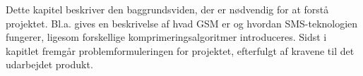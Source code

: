 Dette kapitel beskriver den baggrundsviden, der er nødvendig for at forstå projektet. Bl.a. gives en beskrivelse af hvad GSM er og hvordan SMS-teknologien fungerer, ligesom forskellige komprimeringsalgoritmer introduceres. Sidst i kapitlet fremgår problemformuleringen for projektet, efterfulgt af kravene til det udarbejdet produkt.
